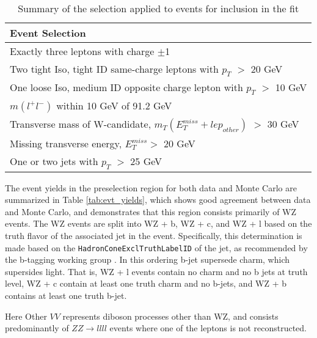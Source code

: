 \begin{table}[H] 
    \centering
    \begin{tabular}{l}
        \hline\hline
        Event Selection\\
        \hline 
        Exactly three leptons with charge $\pm$1 \\
        Two tight Iso, tight ID same-charge leptons with $p_T$ $>$ 20 GeV \\
        One loose Iso, medium ID opposite charge lepton with $p_T$ $>$ 10 GeV \\
        $m(l^+l^-)$ within 10 GeV of 91.2 GeV \\
        Transverse mass of W-candidate, $m_T(E_T^{miss} + lep_{other})$ $>$ 30 GeV \\
        Missing transverse energy, $E_T^{miss} >$ 20 GeV \\
        One or two jets with $p_T$ $>$ 25 GeV \\
        \hline\hline
    \end{tabular}
    \caption{Summary of the selection applied to events for inclusion in the fit}
    \label{tbl:selection}
\end{table}

The event yields in the preselection region for both data and Monte Carlo are summarized in Table \ref{tab:evt_yields}, which shows good agreement between data and Monte Carlo, and demonstrates that this region consists primarily of WZ events. The WZ events are split into WZ + b, WZ + c, and WZ + l based on the truth flavor of the associated jet in the event. Specifically, this determination is made based on the \verb!HadronConeExclTruthLabelID! of the jet, as recommended by the b-tagging working group \cite{BtagWG}. In this ordering b-jet supersede charm, which supersides light. That is, WZ + l events contain no charm and no b jets at truth level, WZ + c contain at least one truth charm and no b-jets, and WZ + b contains at least one truth b-jet. 

\begin{table}[H] 
    \centering
        
    \label{tab:evt_yields}
\end{table}

Here Other $VV$ represents diboson processes other than WZ, and consists predominantly of $ZZ\rightarrow llll$ events where one of the leptons is not reconstructed.

